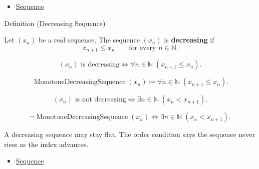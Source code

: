 \begin{dependencies}
\begin{itemize}
  \item \hyperref[def:sequence]{Sequence}
\end{itemize}
\end{dependencies}


\begin{definitionbox}{Definition (Decreasing Sequence)}
\begin{definition}
\label{def:decreasing-sequence}
Let $(x_n)$ be a real sequence. The sequence $(x_n)$ is
\textbf{decreasing} if
\[
  x_{n+1} \le x_n
  \qquad
  \text{for every } n\in\mathbb{N}.
\]
\end{definition}
\end{definitionbox}

\begin{remark*}
\[
(x_n)\text{ is decreasing}
\Longleftrightarrow
\forall n\in\mathbb{N}\;(x_{n+1}\le x_n).
\]
\end{remark*}

\begin{remark*}
\[
\operatorname{MonotoneDecreasingSequence}(x_n)
\coloneqq
\forall n\in\mathbb{N}\;(x_{n+1}\le x_n).
\]
\end{remark*}

\begin{remark*}
\[
(x_n)\text{ is not decreasing}
\Longleftrightarrow
\exists n\in\mathbb{N}\;(x_n<x_{n+1}).
\]
\end{remark*}

\begin{remark*}
\[
\neg\operatorname{MonotoneDecreasingSequence}(x_n)
\Longleftrightarrow
\exists n\in\mathbb{N}\;(x_n<x_{n+1}).
\]
\end{remark*}

\begin{remark*}[Interpretation]
A decreasing sequence may stay flat. The order condition says the sequence
never rises as the index advances.
\end{remark*}

\begin{dependencies}
\begin{itemize}
  \item \hyperref[def:sequence]{Sequence}
\end{itemize}
\end{dependencies}

